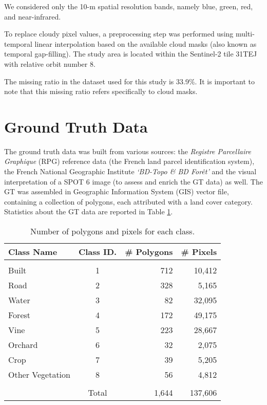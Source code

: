 We considered only the 10-m spatial resolution bands, namely blue, green, red, and near-infrared.

To replace cloudy pixel values, a preprocessing step was performed using multi-temporal linear interpolation based on the available cloud masks (also known as temporal gap-filling\cite{IENCO201911}).
The study area is located within the Sentinel-2 tile 31TEJ with relative orbit number 8.

The missing ratio in the dataset used for this study is 33.9\%. It is important to note that this missing ratio refers specifically to cloud masks.

\section{Ground Truth Data}

The ground truth data was built from various sources: the \textit{Registre Parcellaire Graphique} (RPG) reference data (the French land parcel identification system), the French National Geographic Institute \textit{‘BD-Topo \& BD Forêt’} and the visual interpretation of a SPOT 6 image (to assess and enrich the GT data) as well. 
The GT was assembled in Geographic Information System (GIS) vector file, containing a collection of polygons, each attributed with a land cover category. 
Statistics about the GT data are reported in Table \ref{tab:gt}.

\begin{table}[H]
\centering
\begin{tabular}{lcrr}
  Class Name & Class ID. & \# Polygons & \# Pixels \\[0.2cm]\hline \\[-0.2cm] 
  Built & 1 & 712 & 10,412\\
  Road  & 2 & 328 & 5,165\\
  Water & 3 & 82 & 32,095\\
  Forest  & 4 & 172 & 49,175\\
  Vine  & 5 & 223 & 28,667\\
  Orchard & 6 & 32 & 2,075\\
  Crop  & 7 & 39 & 5,205\\
  Other Vegetation & 8  & 56 & 4,812 \\[0.2cm]\hline \\[-0.2cm] 
  & Total & 1,644 & 137,606
\end{tabular}
\caption{Number of polygons and pixels for each class.}
\label{tab:gt}
\end{table}


